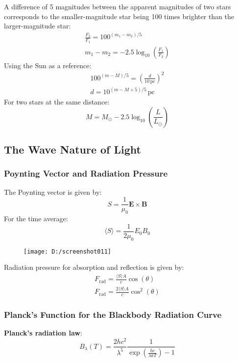 \documentclass[12pt,a4paper]{book}
\begin{document}
	A difference of 5 magnitudes between the apparent magnitudes of two stars corresponds to the smaller-magnitude star being 100 times brighter than the larger-magnitude star:
	\begin{gather}
		\frac{F_2}{F_1} = 100^{(m_1 - m_2)/5} \\
		m_1 - m_2 = -2.5 \log_{10}\left(\frac{F_1}{F_2}\right)
	\end{gather}
	Using the Sun as a reference:
	\begin{gather}
		100^{(m - M)/5} = \left(\frac{d}{10 \, \text{pc}}\right)^2 \\
		d = 10^{(m - M + 5)/5} \, \text{pc}
	\end{gather}
	For two stars at the same distance:
	\begin{equation}
		M = M_{\odot} - 2.5 \log_{10}\left(\frac{L}{L_{\odot}}\right)
	\end{equation}
	
	\subsection{The Wave Nature of Light}
	\subsubsection{Poynting Vector and Radiation Pressure}
	The Poynting vector is given by:
	\begin{equation}
		S = \frac{1}{\mu_0} \mathbf{E} \times \mathbf{B}
	\end{equation}
	For the time average:
	\begin{equation}
		\langle S \rangle = \frac{1}{2\mu_0} E_0 B_0
	\end{equation}
	\begin{figure}
		\centering
		\texttt{[image: D:/screenshot011]}
		\caption{}
		\label{fig:screenshot011}
	\end{figure}
	Radiation pressure for absorption and reflection is given by:
	\begin{gather}
		F_{\text{rad}} = \frac{\langle S \rangle A}{c} \cos(\theta) \tag{absorption}\\
		F_{\text{rad}} = \frac{2\langle S \rangle A}{c} \cos^2(\theta) \tag{reflection}
	\end{gather}
	
	\subsubsection{Planck's Function for the Blackbody Radiation Curve}
	\textbf{Planck's radiation law}:
	\begin{equation}
		B_{\lambda}(T) = \frac{2hc^2}{\lambda^5} \frac{1}{\exp\left(\frac{hc}{\lambda kT}\right) - 1}
	\end{equation}
	
\end{document}
